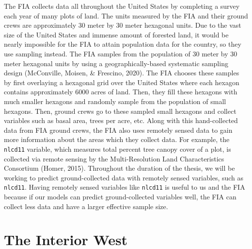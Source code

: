\documentclass[12pt,twoside]{reedthesis}
\begin{document}
The FIA collects data all throughout the United States by completing a survey each year of many plots of land. The units measured by the FIA and their ground crews are approximately 30 meter by 30 meter hexagonal units. Due to the vast size of the United States and immense amount of forested land, it would be nearly impossible for the FIA to attain population data for the country, so they use sampling instead. The FIA samples from the population of 30 meter by 30 meter hexagonal units by using a geographically-based systematic sampling design (McConville, Moisen, \& Frescino, 2020). The FIA chooses these samples by first overlaying a hexagonal grid over the United States where each hexagon contains approximately 6000 acres of land. Then, they fill these hexagons with much smaller hexagons and randomly sample from the population of small hexagons. Then, ground crews go to these sampled small hexagons and collect variables such as basal area, trees per acre, etc. Along with this hand-collected data from FIA ground crews, the FIA also uses remotely sensed data to gain more information about the areas which they collect data. For example, the \texttt{nlcd11} variable, which measures total percent tree canopy cover of a plot, is collected via remote sensing by the Multi-Resolution Land Characteristics Consortium (Homer, 2015). Throughout the duration of the thesis, we will be working to predict ground-collected data with remotely sensed variables, such as \texttt{nlcd11}. Having remotely sensed variables like \texttt{nlcd11} is useful to us and the FIA because if our models can predict ground-collected variables well, the FIA can collect less data and have a larger effective sample size.

\hypertarget{the-interior-west}{%
\section{The Interior West}\label{the-interior-west}}
\end{document}
